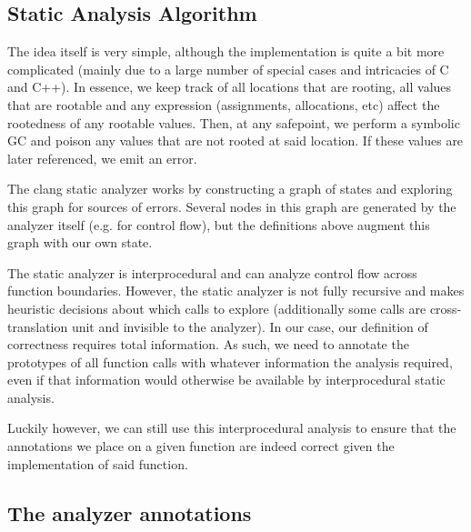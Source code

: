 \hypertarget{7498210263575228495}{}


\subsection{Static Analysis Algorithm}



The idea itself is very simple, although the implementation is quite a bit more complicated (mainly due to a large number of special cases and intricacies of C and C++). In essence, we keep track of all locations that are rooting, all values that are rootable and any expression (assignments, allocations, etc) affect the rootedness of any rootable values. Then, at any safepoint, we perform a {\textquotedbl}symbolic GC{\textquotedbl} and poison any values that are not rooted at said location. If these values are later referenced, we emit an error.



The clang static analyzer works by constructing a graph of states and exploring this graph for sources of errors. Several nodes in this graph are generated by the analyzer itself (e.g. for control flow), but the definitions above augment this graph with our own state.



The static analyzer is interprocedural and can analyze control flow across function boundaries. However, the static analyzer is not fully recursive and makes heuristic decisions about which calls to explore (additionally some calls are cross-translation unit and invisible to the analyzer). In our case, our definition of correctness requires total information. As such, we need to annotate the prototypes of all function calls with whatever information the analysis required, even if that information would otherwise be available by interprocedural static analysis.



Luckily however, we can still use this interprocedural analysis to ensure that the annotations we place on a given function are indeed correct given the implementation of said function.



\hypertarget{5382015011410468170}{}


\subsection{The analyzer annotations}



